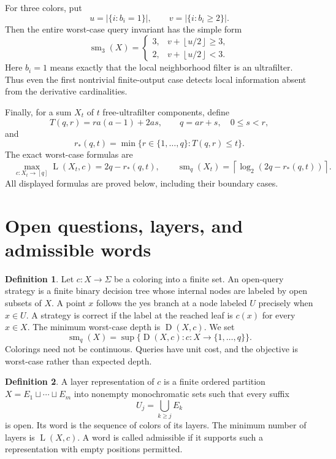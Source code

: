 \documentclass[11pt,letterpaper]{article}
\numberwithin{equation}{section}
\theoremstyle{definition}
\newtheorem{definition}[definition]{Definition}
\theoremstyle{remark}
\theoremstyle{definition}
\newcommand{\sm}{\operatorname{sm}}
\newcommand{\ceil}[1]{\left\lceil#1\right\rceil}
\newcommand{\depth}{\operatorname{D}}
\newcommand{\layers}{\operatorname{L}}
\newcommand{\floor}[1]{\left\lfloor #1\right\rfloor}
\newcommand{\sq}{\mathbin{\sqcup}}
\begin{document}
For three colors, put
\[
 u=|\{i:b_i=1\}|,\qquad v=|\{i:b_i\geq2\}|.
\]
Then the entire worst-case query invariant has the simple form
\begin{equation}\label{fp:eq:ternary-intro}
 \boxed{\quad
 \sm_3(X)=
 \begin{cases}
 3,&v+\floor{u/2}\geq3,\\
 2,&v+\floor{u/2}<3.
 \end{cases}\quad}
\end{equation}
Here \(b_i=1\) means exactly that the local neighborhood filter is an
ultrafilter. Thus even the first nontrivial finite-output case detects
local information absent from the derivative cardinalities.

Finally, for a sum \(X_t\) of \(t\) free-ultrafilter components, define
\begin{equation}\label{fp:eq:T-intro}
 T(q,r)=r a(a-1)+2as,\qquad q=ar+s,\quad 0\leq s<r,
\end{equation}
and
\[
 r_*(q,t)=\min\{r\in\{1,\ldots,q\}:T(q,r)\leq t\}.
\]
The exact worst-case formulas are
\begin{equation}\label{fp:eq:ultra-intro}
 \boxed{\quad
 \max_{c:X_t\to[q]}\layers(X_t,c)=2q-r_*(q,t),\qquad
 \sm_q(X_t)=\ceil{\log_2(2q-r_*(q,t))}.
 \quad}
\end{equation}
All displayed formulas are proved below, including their boundary cases.

\section{Open questions, layers, and admissible words}
\label{fp:sec:normal}

\begin{definition}
Let \(c:X\to\Sigma\) be a coloring into a finite set. An open-query
strategy is a finite binary decision tree whose internal nodes are labeled
by open subsets of \(X\). A point \(x\) follows the yes branch at a node
labeled \(U\) precisely when \(x\in U\). A strategy is correct if the label
at the reached leaf is \(c(x)\) for every \(x\in X\).
The minimum worst-case depth is \(\depth(X,c)\). We set
\[
 \sm_q(X)=\sup\{\depth(X,c):c:X\to\{1,\ldots,q\}\}.
\]
Colorings need not be continuous. Queries have unit cost, and the objective
is worst-case rather than expected depth.
\end{definition}

\begin{definition}
A layer representation of \(c\) is a finite ordered partition
\(X=E_1\sq\cdots\sq E_m\) into nonempty monochromatic sets such that
every suffix
\[
 U_j=\bigcup_{k\geq j}E_k
\]
is open. Its word is the sequence of colors of its layers. The minimum
number of layers is \(\layers(X,c)\). A word is called admissible if it
supports such a representation with empty positions permitted.
\end{definition}
\end{document}
